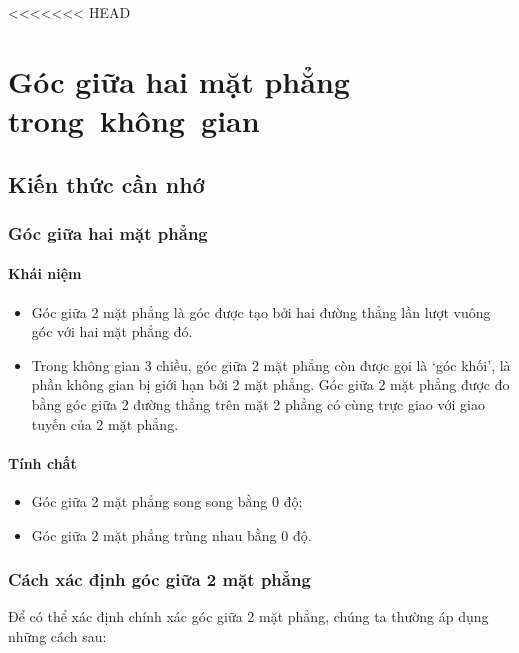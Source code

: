 <<<<<<< HEAD
\setcounter{section}{29}
\setcounter{ex}{0}
\section{Góc giữa hai mặt phẳng trong~không~gian}
\subsection{Kiến thức cần nhớ}
\begin{khung}
\subsubsection{Góc giữa hai mặt phẳng}
	\paragraph{Khái niệm}
	\begin{itemize}
		\item Góc giữa 2 mặt phẳng là góc được tạo bởi hai đường thẳng lần lượt vuông góc với hai mặt phẳng đó.
		\item Trong không gian 3 chiều, góc giữa 2 mặt phẳng còn được gọi là \lq góc khối\rq, là phần không gian bị giới hạn bởi 2 mặt phẳng. Góc giữa 2 mặt phẳng được đo bằng góc giữa 2 đường thẳng trên mặt 2 phẳng có cùng trực giao với giao tuyến của 2 mặt phẳng.
		\end{itemize}
	\paragraph{Tính chất}
			\begin{itemize}
				\item Góc giữa 2 mặt phẳng song song bằng $ 0 $ độ;
				\item Góc giữa 2 mặt phẳng trùng nhau bằng $ 0 $ độ.
			\end{itemize}
\subsubsection{Cách xác định góc giữa 2 mặt phẳng}
Để có thể xác định chính xác góc giữa 2 mặt phẳng, chúng ta thường áp dụng những cách sau:
 

\end{khung}
